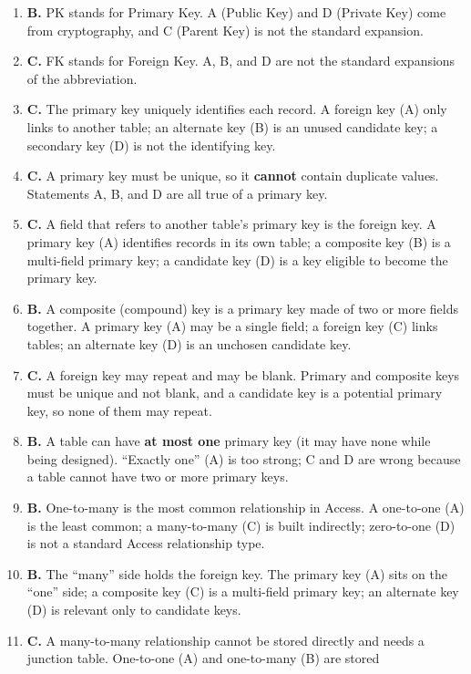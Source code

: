 \begin{enumerate}[label=\textbf{Q\arabic*.}, leftmargin=*]
\item \textbf{B.} PK stands for Primary Key. A (Public Key) and D (Private
  Key) come from cryptography, and C (Parent Key) is not the standard
  expansion.
\item \textbf{C.} FK stands for Foreign Key. A, B, and D are not the standard
  expansions of the abbreviation.
\item \textbf{C.} The primary key uniquely identifies each record. A foreign
  key (A) only links to another table; an alternate key (B) is an unused
  candidate key; a secondary key (D) is not the identifying key.
\item \textbf{C.} A primary key must be unique, so it \textbf{cannot} contain
  duplicate values. Statements A, B, and D are all true of a primary key.
\item \textbf{C.} A field that refers to another table's primary key is the
  foreign key. A primary key (A) identifies records in its own table; a
  composite key (B) is a multi-field primary key; a candidate key (D) is a key
  eligible to become the primary key.
\item \textbf{B.} A composite (compound) key is a primary key made of two or
  more fields together. A primary key (A) may be a single field; a foreign key
  (C) links tables; an alternate key (D) is an unchosen candidate key.
\item \textbf{C.} A foreign key may repeat and may be blank. Primary and
  composite keys must be unique and not blank, and a candidate key is a
  potential primary key, so none of them may repeat.
\item \textbf{B.} A table can have \textbf{at most one} primary key (it may
  have none while being designed). ``Exactly one'' (A) is too strong; C and D
  are wrong because a table cannot have two or more primary keys.
\item \textbf{B.} One-to-many is the most common relationship in Access. A
  one-to-one (A) is the least common; a many-to-many (C) is built indirectly;
  zero-to-one (D) is not a standard Access relationship type.
\item \textbf{B.} The ``many'' side holds the foreign key. The primary key
  (A) sits on the ``one'' side; a composite key (C) is a multi-field primary
  key; an alternate key (D) is relevant only to candidate keys.
\item \textbf{C.} A many-to-many relationship cannot be stored directly and
  needs a junction table. One-to-one (A) and one-to-many (B) are stored

\end{enumerate}
